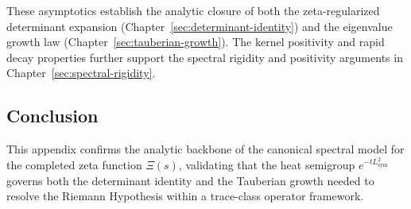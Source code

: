 These asymptotics establish the analytic closure of both the zeta-regularized determinant expansion (Chapter~\ref{sec:determinant-identity}) and the eigenvalue growth law (Chapter~\ref{sec:tauberian-growth}). The kernel positivity and rapid decay properties further support the spectral rigidity and positivity arguments in Chapter~\ref{sec:spectral-rigidity}.

\subsection*{Conclusion}

This appendix confirms the analytic backbone of the canonical spectral model for the completed zeta function \( \Xi(s) \), validating that the heat semigroup \( e^{-t L_{\mathrm{sym}}^2} \) governs both the determinant identity and the Tauberian growth needed to resolve the Riemann Hypothesis within a trace-class operator framework.
